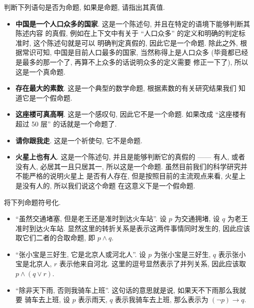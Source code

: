 \documentclass[10pt,UTF8]{book} %
\begin{document}
\begin{exercise}
    判断下列语句是否为命题, 如果是命题, 请指出其真值.
    \begin{itemize}[itemsep=0pt]
        \item \textbf{中国是一个人口众多的国家}. 这是一个陈述句, 并且在特定的语境下能够判断其陈述内容
        的真假, 例如在上下文中有关于 “人口众多” 的定义和明确的判定标准时, 这个陈述句就是可以
        明确判定真假的, 因此它是一个命题. 除此之外, 根据常识可知, 中国是目前人口最多的国家,
        当然称得上是人口众多 (毕竟都已经是最多的那一个了, 再算不上众多的话说明众多的定义需要
        修正一下了), 所以这是一个真命题.
        \item \textbf{存在最大的素数}. 这是一个典型的数学命题, 根据素数的有关研究结果我们
        知道它是一个假命题.
        \item \textbf{这座楼可真高啊}. 这是一个感叹句, 因此它不是一个命题. 如果改成 “这座楼有
        超过 50 层” 的话就是一个命题了.
        \item \textbf{请你跟我走}. 这是一个祈使句, 它不是命题.
        \item \textbf{火星上也有人}. 这是一个陈述句, 并且是能够判断它的真假的 —— 有人, 或者没有人,
        必居其一且只居其一, 所以这是一个命题. 虽然目前我们的科学研究并不能严格的说明火星上
        是否有人存在, 但是按照目前的主流观点来看, 火星上是没有人的, 所以我们说这个命题
        在这意义下是一个假命题.
    \end{itemize}
\end{exercise}

\begin{exercise}
    将下列命题符号化.
    \begin{itemize}[itemsep=0pt]
        \item “虽然交通堵塞, 但是老王还是准时到达火车站”. 设 $p$ 为交通拥堵,
        设 $q$ 为老王准时到达火车站. 显然这里的转折关系是表示这两件事情同时发生的,
        因此应该取它们二者的合取命题, 即 $p \wedge q$.
        \item “张小宝是三好生, 它是北京人或河北人”. 设 $p$ 为张小宝是三好生,
        $q$ 表示张小宝是北京人, $r$ 表示他来自河北. 这里的逗号显然表示了并列关系,
        因此应该取 $p \wedge (q \vee r)$.
        \item “除非天下雨, 否则我骑车上班”. 这句话的意思就是说, 如果天不下雨那么我就要
        骑车去上班, 设 $p$ 表示雨天, $q$ 表示我骑车去上班, 那么表示为
        $(\lnot p) \longrightarrow q$.
    \end{itemize}
\end{exercise}
\end{document}
